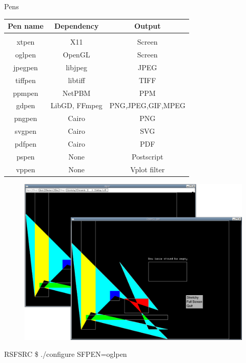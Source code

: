 \begin{frame}
  \begin{block}{Pens}
  \begin{table}
    \begin{center}
     \begin{tabular}{|c|c|c|}
      \hline    Pen name   &  Dependency   &    Output          \\
      \hline & & \\[-1em]
      \hline     xtpen     &     X11       &     Screen         \\
      \hline     oglpen    &   OpenGL      &     Screen         \\
      \hline     jpegpen   &   libjpeg     &     JPEG           \\
      \hline     tiffpen   &   libtiff     &     TIFF           \\
      \hline     ppmpen    &   NetPBM      &     PPM            \\
      \hline     gdpen     & LibGD, FFmpeg &  PNG,JPEG,GIF,MPEG \\
      \hline     pngpen    &   Cairo       &      PNG           \\
      \hline     svgpen    &   Cairo       &      SVG           \\
      \hline     pdfpen    &   Cairo       &      PDF           \\
      \hline     pspen     &    None       &   Postscript       \\
      \hline     vppen     &    None       &   Vplot filter     \\
      \hline
    \end{tabular}
   \end{center}
  \end{table}
  \end{block}
\end{frame}

\begin{frame}
  \begin{figure}
  \includegraphics[scale=0.3]{Fig/xtglpens.pdf}
  \end{figure}
  \begin{block}{}
   RSFSRC \$ ./configure SFPEN=oglpen
  \end{block}
\end{frame}

